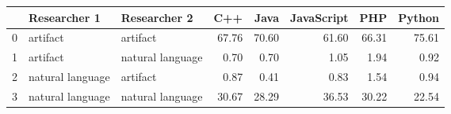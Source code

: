 \begin{tabular}{lllrrrrr}
\toprule
{} &      Researcher 1 &      Researcher 2 &   C++ &  Java &  JavaScript &   PHP &  Python \\
\midrule
0 &          artifact &          artifact & 67.76 & 70.60 &       61.60 & 66.31 &   75.61 \\
1 &          artifact &  natural language &  0.70 &  0.70 &        1.05 &  1.94 &    0.92 \\
2 &  natural language &          artifact &  0.87 &  0.41 &        0.83 &  1.54 &    0.94 \\
3 &  natural language &  natural language & 30.67 & 28.29 &       36.53 & 30.22 &   22.54 \\
\bottomrule
\end{tabular}
